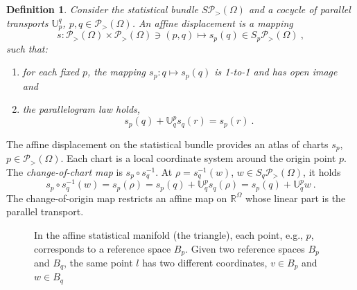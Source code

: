 \documentclass[axioms,article,submit,pdftex,moreauthors]{Definitions/mdpi}
\theoremstyle{plain}
\newtheorem{mydef}{Definition}
\theoremstyle{remark}
\newcommand{\expbundleat}[1]{S\pdensitieson{#1}}
\newcommand{\expfibreat}[2]{S_{#1}\pdensitieson{#2}}
\newcommand{\pdensitieson}[1]{\mathcal P_{>}\left(#1\right)}
\newcommand{\reals}{\mathbb{R}}
\newcommand{\transport}[2]{{\mathbb U} _ {#1} ^ {#2}}
\begin{document}
\begin{mydef} \label{def:affine-displacement} 
Consider the statistical bundle $\expbundleat\Omega$ and a cocycle of parallel transports $\transport p q$, $p,q \in \pdensitieson\Omega$. An \emph{affine displacement} is a mapping
\begin{equation*}
  s \colon \pdensitieson\Omega \times \pdensitieson \Omega \ni (p,q) \mapsto s_p(q) \in \expfibreat p \Omega \ ,
\end{equation*}
 such that:
 \begin{enumerate}
     \item for each fixed \( p \), the mapping \( s_{p} : q \mapsto s_{p}(q) \) is 1-to-1 and has open image and
     \item \label{item:parallelogram-law} the \emph{parallelogram law} holds,
     \begin{equation*}
  s_p(q) + \transport q p s_q(r) = s_p(r) \ .       
     \end{equation*} \end{enumerate}
\end{mydef}

The affine displacement on the statistical bundle provides an atlas of charts \( s_{p} \), \( p \in \pdensitieson\Omega \). Each chart is a local coordinate system around the origin point \( p \). The \emph{change-of-chart map} is \( s_{p} \circ s_{q}^{-1} \). At \( \rho = s_{q}^{-1}(w) \), $w \in \expfibreat q \Omega$, it holds
\begin{equation} \label{eq:change-of-chart-generic}
s_{p} \circ s_{q}^{-1}(w) = s_{p}(\rho) = s_{p}(q) + \transport q p  s_{q}(\rho) = s_{p}(q) + \transport q p w \ .
\end{equation} 
The change-of-origin map restricts an affine map on $\reals^\Omega$ whose linear part is the parallel transport. 
\begin{figure}[t]
    \centering
   
    \caption{In the affine statistical manifold (the triangle), each point, e.g., $p$, corresponds to a reference space $B_p$. Given two reference spaces $B_p$ and $B_q$, the same point $l$ has two different coordinates, $v \in B_p$ and $w \in B_q$}
    \label{fig:Af}
\end{figure}
\end{document}

